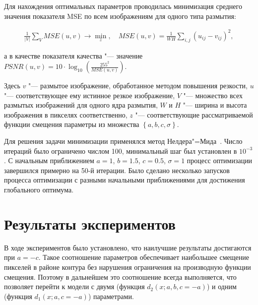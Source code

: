 

Для нахождения оптимальных параметров проводилась минимизация среднего значения показателя MSE по всем изображениям для одного типа размытия:

\begin{align*}
	\frac{1}{\left|V\right|}\sum_{V}{MSE\left(u,v\right) \rightarrow \min_{z}}, \quad
	MSE\left(u,v\right)=\frac{1}{WH}\sum_{i,j}{(u_{ij}-v_{ij})}^2,
\end{align*}

\noindent а в качестве показателя качества "--- значение $PSNR\left(u,v\right) = 10 \cdot \log_{10}{\left(\frac{255^2}{MSE\left(u,v\right)}\right)}$.

Здесь $v$ "--- размытое изображение, обработанное методом повышения резкости, $u$ "--- соответствующее ему истинное резкое изображение, $V$ "--- множество всех размытых изображений для одного ядра размытия, $W$ и $H$ "--- ширина и высота изображения в пикселях соответственно, $z$ "--- соответствующие рассматриваемой функции смещения параметры из множества $\left\{a, b, c, \sigma\right\}$.

Для решения задачи минимизации применялся метод Нелдера"=Мида~\cite{10.1093/comjnl/7.4.308}. Число итераций было ограничено числом 100, минимальный шаг был установлен в $10^{-3}$. С начальным приближением $a=1$, $b=1.5$, $c=0.5$, $\sigma=1$ процесс оптимизации завершился примерно на 50-й итерации. Было сделано несколько запусков процесса оптимизации с разными начальными приближениями для достижения глобального оптимума.

\section{Результаты экспериментов}

В ходе экспериментов было установлено, что наилучшие результаты достигаются при $a=-c$. Такое соотношение параметров обеспечивает наибольшее смещение пикселей в районе контура без нарушения ограничения на производную функции смещения. Поэтому в дальнейшем это соотношение всегда выполняется, что позволяет перейти к модели с двумя (функция $d_2(x;a,b,c=-a)$) и одним (функция $d_1(x;a,c=-a)$) параметрами.

